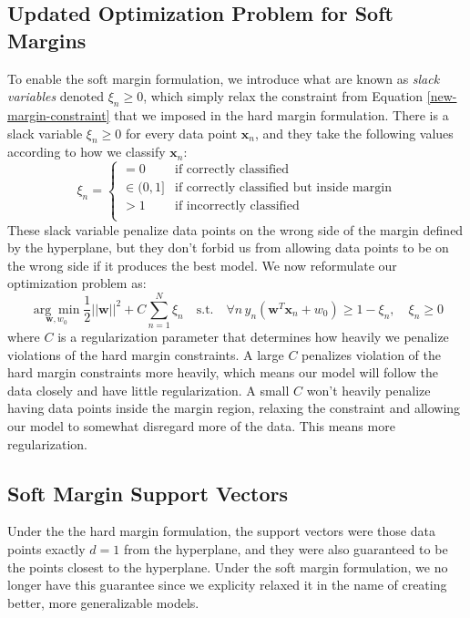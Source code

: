 \subsection{Updated Optimization Problem for Soft Margins}
To enable the soft margin formulation, we introduce what are known as \textit{slack variables} denoted $\xi_{n} \geq 0$, which simply relax the constraint from Equation \ref{new-margin-constraint} that we imposed in the hard margin formulation. There is a slack variable $\xi_{n} \geq 0$ for every data point $\textbf{x}_{n}$, and they take the following values according to how we classify $\textbf{x}_{n}$:
\begin{equation} \label{slack-variable-values}
	\xi_{n} = \begin{cases}
	 	= 0 & \text{if correctly classified} \\
		\in (0, 1] & \text{if correctly classified but inside margin} \\
		> 1 & \text{if incorrectly classified} \\
	\end{cases}
\end{equation}
These slack variable penalize data points on the wrong side of the margin defined by the hyperplane, but they don't forbid us from allowing data points to be on the wrong side if it produces the best model. We now reformulate our optimization problem as:
\begin{equation} \label{soft-margin-optimization-problem}
	\underset{\textbf{w}, w_{0}}{\arg\min} \frac{1}{2} ||\textbf{w}||^{2} + C \sum_{n=1}^{N} \xi_{n} \quad \text{s.t.} \quad \forall n \, y_{n}(\textbf{w}^{T}\textbf{x}_{n} + w_{0}) \geq 1 - \xi_{n}, \quad \xi_{n} \geq 0
\end{equation}
where $C$ is a regularization parameter that determines how heavily we penalize violations of the hard margin constraints. A large $C$ penalizes violation of the hard margin constraints more heavily, which means our model will follow the data closely and have little regularization. A small $C$ won't heavily penalize having data points inside the margin region, relaxing the constraint and allowing our model to somewhat disregard more of the data. This means more regularization.


\subsection{Soft Margin Support Vectors}
Under the the hard margin formulation, the support vectors were those data points exactly $d=1$ from the hyperplane, and they were also guaranteed to be the points closest to the hyperplane. Under the soft margin formulation, we no longer have this guarantee since we explicity relaxed it in the name of creating better, more generalizable models.

